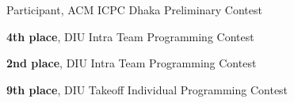 %
%
%


\begin{scholarship}
        {Participant, ACM ICPC Dhaka Preliminary Contest}

        {\textbf{4th place}, DIU Intra Team Programming Contest}

        {\textbf{2nd place}, DIU Intra Team Programming Contest}

        {\textbf{9th place}, DIU Takeoff Individual Programming Contest}

    \emptySeparator
\end{scholarship}